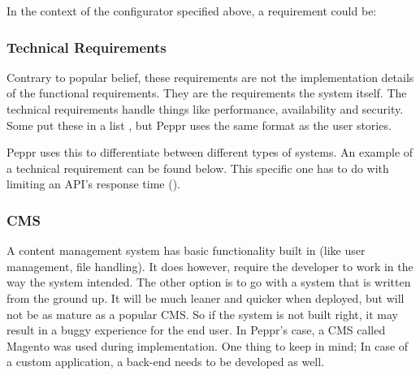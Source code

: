 \newline

In the context of the configurator specified above, a requirement could be: \newline

\newline

\subsubsection{Technical Requirements}
Contrary to popular belief, these requirements are not the implementation details of the functional requirements. They are the requirements the system itself. The technical requirements handle things like performance, availability and security. Some put these in a list \cite{agileTechnicalRequirements}, but Peppr uses the same format as the user stories. \newline

\newline

Peppr uses this to differentiate between different types of systems. An example of a technical requirement can be found below. This specific one has to do with limiting an API's response time (\cite{responseTimes}).

\newline

\subsubsection{CMS}
A content management system has basic functionality built in (like user management, file handling). It does however, require  the developer to work in the way the system intended. The other option is to go with a system that is written from the ground up. It will be much leaner and quicker when deployed, but will not be as mature as a popular CMS. So if the system is not built right, it may result in a buggy experience for the end user. In Peppr's case, a CMS called Magento was used during implementation. One thing to keep in mind; In case of a custom application, a back-end needs to be developed as well.
